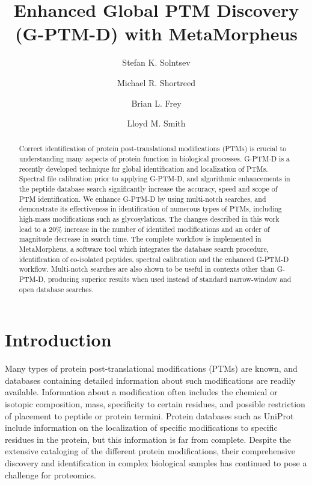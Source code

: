 \documentclass[journal=jprobs,manuscript=article]{achemso}
\author{Stefan K. Solntsev}
\author{Michael R. Shortreed}
\author{Brian L. Frey}
\author{Lloyd M. Smith}
\affiliation[UwMadison]
{University of Wisconsin-Madison}
\title[Enhanced Global PTM Discovery (G-PTM-D) with MetaMorpheus]
  {Enhanced Global PTM Discovery (G-PTM-D) with MetaMorpheus}
\begin{document}
	

\sloppy

\begin{abstract}

Correct identification of protein post-translational modifications (PTMs) is crucial to understanding many aspects of protein function in biological processes.
G-PTM-D is a recently developed technique for global identification and localization of PTMs.
Spectral file calibration prior to applying G-PTM-D, and algorithmic enhancements in the peptide database search significantly increase the accuracy, speed and scope of PTM identification.
We enhance G-PTM-D by using multi-notch searches, and demonstrate its effectiveness in identification of numerous types of PTMs, including high-mass modifications such as glycosylations.
The changes described in this work lead to a 20\% increase in the number of identified modifications and an order of magnitude decrease in search time.
The complete workflow is implemented in MetaMorpheus, a software tool which integrates the database search procedure, identification of co-isolated peptides, spectral calibration and the enhanced G-PTM-D workflow.
Multi-notch searches are also shown to be useful in contexts other than G-PTM-D, producing superior results when used instead of standard narrow-window and open database searches.
\end{abstract}

\section{Introduction}

Many types of protein post-translational modifications (PTMs) are known, and databases containing detailed information about such modifications are readily available\citep{Creasy_2004}.
Information about a modification often includes the chemical or isotopic composition, mass, specificity to certain residues, and possible restriction of placement to peptide or protein termini.
Protein databases such as UniProt\citep{Uniprot_2017} include information on the localization of specific modifications to specific residues in the protein, but this information is far from complete.
Despite the extensive cataloging of the different protein modifications, their comprehensive discovery and identification in complex biological samples has continued to pose a challenge for proteomics\citep{Olsen_2013}.
\end{document}
